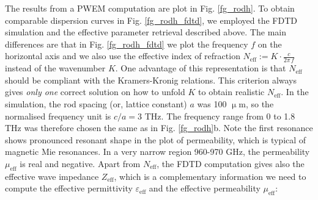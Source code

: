\documentclass[letterpaper,12pt]{report}
\newcommand{\um}{\mbox{$\upmu$m}}
\begin{document}

The results from a PWEM computation are plot in Fig. \ref{fg_rodh}. To obtain comparable dispersion curves in Fig. \ref{fg_rodh_fdtd}, we employed the FDTD simulation and the effective parameter retrieval described above. The main differences are that in Fig. \ref{fg_rodh_fdtd} we plot the frequency $f$ on the horizontal axis and we also use the effective index of refraction $N_{\text{eff}} := K\cdot \frac{c}{2\pi\,f}$ instead of the wavenumber $K$. One advantage of this representation is that $N_{\text{eff}}$ should be compliant with the Kramers-Kronig relations. This criterion always gives \textit{only one} correct solution on how to unfold $K$ to obtain realistic $N_{\text{eff}}$. 
In the simulation, the rod spacing (or, lattice constant) $a$ was 100 \um, so the normalised frequency unit is $c/a = 3$ THz. The frequency range from 0 to 1.8 THz was therefore chosen the same as in Fig. \ref{fg_rodh}b. 
Note the first resonance shows pronounced resonant shape in the plot of permeability, which is typical of magnetic Mie resonances. In a very narrow region 960-970 GHz, the permeability $\mu_{\text{eff}}$ is real and negative. 
Apart from $N_{\text{eff}}$, the FDTD computation gives also the effective wave impedance $Z_{\text{eff}}$, which is a complementary information we need to compute the effective permittivity $\varepsilon_{\text{eff}}$ and the effective permeability $\mu_{\text{eff}}$:
\end{document}
